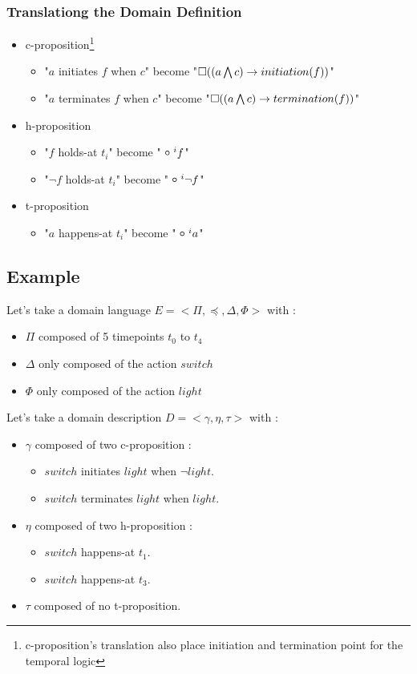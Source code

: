 \subsubsection{Translationg the Domain Definition}

\begin{itemize}
  \item c-proposition\footnote{c-proposition's translation also place initiation and termination point for the temporal logic}
  \begin{itemize}
    \item "$a$ initiates $f$ when $c$" become "$\square((a\bigwedge c)\rightarrow initiation(f))$"
    \item "$a$ terminates $f$ when $c$" become "$\square((a\bigwedge c)\rightarrow termination(f))$"
  \end{itemize}
  \item h-proposition
  \begin{itemize}
    \item "$f$ holds-at $t_i$" become "$\next^{i}f$"
    \item "$\neg f$ holds-at $t_i$" become "$\next^{i} \neg f$"
  \end{itemize}
  \item t-proposition
  \begin{itemize}
    \item "$a$ happens-at $t_i$" become "$\next^{i}a$"
  \end{itemize}
\end{itemize}

\subsection{Example}

Let's take a domain language $E=<\Pi,\preceq,\Delta,\Phi>$ with :
\begin{itemize}
  \item $\Pi$ composed of 5 timepoints $t_0$ to $t_4$
  \item $\Delta$ only composed of the action $switch$
  \item $\Phi$ only composed of the action $light$
\end{itemize}

Let's take a domain description $D=<\gamma,\eta,\tau>$ with :
\begin{itemize}
  \item $\gamma$ composed of two c-proposition :
  \begin{itemize}
    \item $switch$ initiates $light$ when $\neg light$.
    \item $switch$ terminates $light$ when $light$.
  \end{itemize}
  \item $\eta$ composed of two h-proposition :
  \begin{itemize}
    \item $switch$ happens-at $t_1$.
    \item $switch$ happens-at $t_3$.
  \end{itemize}
  \item $\tau$ composed of no t-proposition.
\end{itemize}

